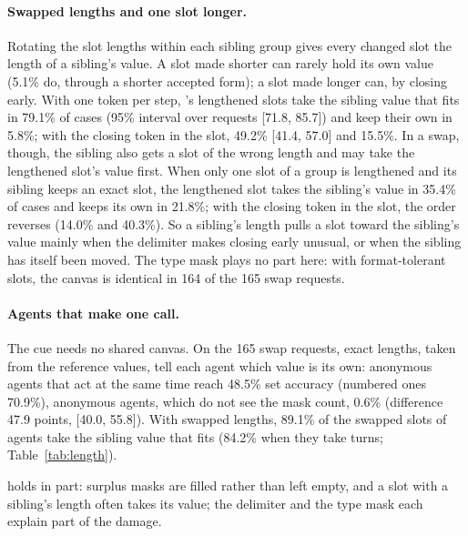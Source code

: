\paragraph{Swapped lengths and one slot longer.} Rotating the slot lengths within each sibling group gives every changed slot the length of a sibling's value. A slot made shorter can rarely hold its own value (5.1\% do, through a shorter accepted form); a slot made longer can, by closing early. With one token per step, \dream's lengthened slots take the sibling value that fits in 79.1\% of cases (95\% interval over requests [71.8, 85.7]) and keep their own in 5.8\%; with the closing token in the slot, 49.2\% [41.4, 57.0] and 15.5\%. In a swap, though, the sibling also gets a slot of the wrong length and may take the lengthened slot's value first. When only one slot of a group is lengthened and its sibling keeps an exact slot, the lengthened slot takes the sibling's value in 35.4\% of cases and keeps its own in 21.8\%; with the closing token in the slot, the order reverses (14.0\% and 40.3\%). So a sibling's length pulls a slot toward the sibling's value mainly when the delimiter makes closing early unusual, or when the sibling has itself been moved. The type mask plays no part here: with format-tolerant slots, the canvas is identical in 164 of the 165 swap requests.

\paragraph{Agents that make one call.} The cue needs no shared canvas. On the 165 swap requests, exact lengths, taken from the reference values, tell each agent which value is its own: anonymous \dream agents that act at the same time reach 48.5\% set accuracy (numbered ones 70.9\%), anonymous \qwen agents, which do not see the mask count, 0.6\% (difference 47.9 points, [40.0, 55.8]). With swapped lengths, 89.1\% of the swapped slots of \dream agents take the sibling value that fits (84.2\% when they take turns; Table~\ref{tab:length}).

 holds in part: surplus masks are filled rather than left empty, and a slot with a sibling's length often takes its value; the delimiter and the type mask each explain part of the damage.
